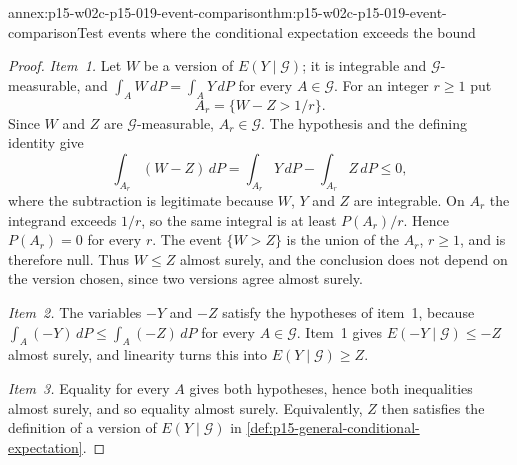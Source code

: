 \begin{annexitem}{annex:p15-w02c-p15-019-event-comparison}{thm:p15-w02c-p15-019-event-comparison}{Test events where the conditional expectation exceeds the bound}
\begin{proof}
\emph{Item~1.} Let \(W\) be a version of \(E(Y\mid\mathcal G)\); it is
integrable and \(\mathcal G\)-measurable, and
\(\int_AW\,dP=\int_AY\,dP\) for every \(A\in\mathcal G\). For an integer
\(r\geq1\) put
\[
                    A_r=\{W-Z>1/r\}.
\]
Since \(W\) and \(Z\) are \(\mathcal G\)-measurable, \(A_r\in\mathcal G\).
The hypothesis and the defining identity give
\[
 \int_{A_r}(W-Z)\,dP=\int_{A_r}Y\,dP-\int_{A_r}Z\,dP\leq0,
\]
where the subtraction is legitimate because \(W\), \(Y\) and \(Z\) are
integrable. On \(A_r\) the integrand exceeds \(1/r\), so the same
integral is at least \(P(A_r)/r\). Hence \(P(A_r)=0\) for every \(r\).
The event \(\{W>Z\}\) is the union of the \(A_r\), \(r\geq1\), and is
therefore null. Thus \(W\leq Z\) almost surely, and the conclusion does
not depend on the version chosen, since two versions agree almost surely.

\emph{Item~2.} The variables \(-Y\) and \(-Z\) satisfy the hypotheses
of item~1, because \(\int_A(-Y)\,dP\leq\int_A(-Z)\,dP\) for every
\(A\in\mathcal G\). Item~1 gives \(E(-Y\mid\mathcal G)\leq-Z\) almost
surely, and linearity turns this into \(E(Y\mid\mathcal G)\geq Z\).

\emph{Item~3.} Equality for every \(A\) gives both hypotheses, hence both
inequalities almost surely, and so equality almost surely. Equivalently,
\(Z\) then satisfies the definition of a version of
\(E(Y\mid\mathcal G)\) in \cref{def:p15-general-conditional-expectation}.
\end{proof}
\end{annexitem}

